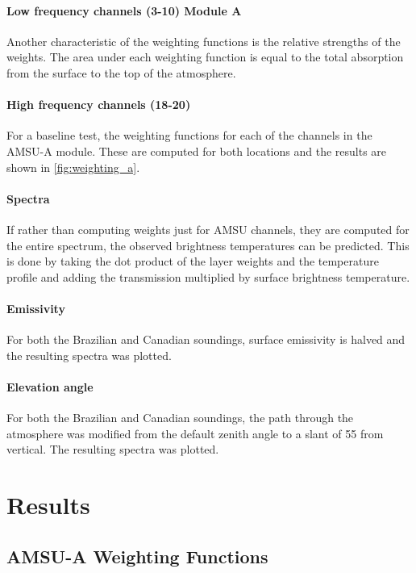 \documentclass[twocol]{ametsoc}
\begin{document}
\paragraph{Low frequency channels (3-10) Module A }

Another characteristic of the weighting functions is the relative strengths of the weights.
The area under each weighting function is equal to the total absorption from the surface to the top of the atmosphere.
 
\paragraph{High frequency channels (18-20)}

For a baseline test, the weighting functions for each of the channels in the AMSU-A module.
These are computed for both locations and the results are shown in \autoref{fig:weighting_a}.

\paragraph{Spectra}

If rather than computing weights just for AMSU channels, they are computed for the entire spectrum, the observed brightness temperatures can be predicted.
This is done by taking the dot product of the layer weights and the temperature profile and adding the transmission multiplied by surface brightness temperature.

\paragraph{Emissivity}
For both the Brazilian and Canadian soundings, surface emissivity is halved and the resulting spectra was plotted.

\paragraph{Elevation angle}
For both the Brazilian and Canadian soundings, the path through the atmosphere was modified from the default zenith angle to a slant of 55\degree{} from vertical.
The resulting spectra was plotted.

\section{Results}

\subsection{AMSU-A Weighting Functions}
\end{document}
